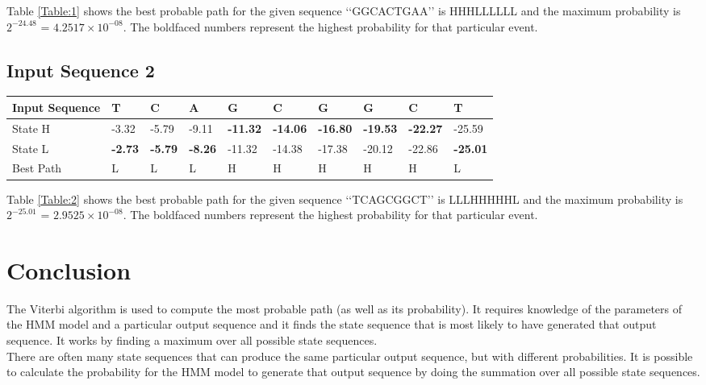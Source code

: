 \documentclass[12pt]{article}
\begin{document}
Table \ref{Table:1} shows the best probable path for the given sequence \lq\lq{GGCACTGAA}\rq\rq{} is HHHLLLLLL and the maximum probability is $2^{-24.48}$ = $4.2517\times10^{-08}$. The boldfaced numbers represent the highest probability for that particular event.

\subsection{Input Sequence 2} 

\begin{center}
\begin{tabular}{ | m{5em} | m{3em} | m{3em} | m{3em} | m{3em} | m{3em} | m{3em} | m{3em} | m{3em} | m{3em} | }
 \hline
 Input Sequence & T & C & A & G & C & G & G & C & T \\
 \hline
 State H & -3.32 & -5.79 & -9.11 & \textbf{-11.32} & \textbf{-14.06} & \textbf{-16.80} & \textbf{-19.53} & \textbf{-22.27} & -25.59  \\
 \hline
 State L & \textbf{-2.73} & \textbf{-5.79} & \textbf{-8.26} & -11.32 & -14.38 & -17.38 & -20.12 & -22.86 & \textbf{-25.01} \\
 \hline
 Best Path & L & L & L & H & H & H & H & H & L \\
 \hline
\end{tabular}
\label{Table:2}
\end{center}

Table \ref{Table:2} shows the best probable path for the given sequence \lq\lq{TCAGCGGCT}\rq\rq{} is LLLHHHHHL and the maximum probability is $2^{-25.01}$ = $2.9525\times10^{-08}$. The boldfaced numbers represent the highest probability for that particular event. 

\section{Conclusion}
The Viterbi algorithm is used to compute the most probable path (as well as its probability). It requires knowledge of the parameters of the HMM model and a particular output sequence and it finds the state sequence that is most likely to have generated that output sequence. It works by finding a maximum over all possible state sequences. \\

There are often many state sequences that can produce the same particular output sequence, but with different probabilities. It is possible to calculate the probability for the HMM model to generate that output sequence by doing the summation over all possible state sequences. 
\end{document}
